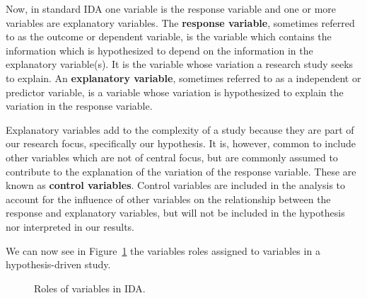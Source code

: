 \documentclass[
  letterpaper,
]{latex/krantz}
\theoremstyle{definition}
\theoremstyle{remark}
\begin{document}
Now, in standard IDA one variable is the response variable and one or
more variables are explanatory variables. The \textbf{response
variable}, sometimes referred to as the outcome or dependent variable,
is the variable which contains the information which is hypothesized to
depend on the information in the explanatory variable(s). It is the
variable whose variation a research study seeks to explain. An
\textbf{explanatory variable}, sometimes referred to as a independent or
predictor variable, is a variable whose variation is hypothesized to
explain the variation in the response variable.

Explanatory variables add to the complexity of a study because they are
part of our research focus, specifically our hypothesis. It is, however,
common to include other variables which are not of central focus, but
are commonly assumed to contribute to the explanation of the variation
of the response variable. These are known as \textbf{control variables}.
Control variables are included in the analysis to account for the
influence of other variables on the relationship between the response
and explanatory variables, but will not be included in the hypothesis
nor interpreted in our results.

We can now see in Figure~\ref{fig-aa-ida-variables} the variables roles
assigned to variables in a hypothesis-driven study.

\begin{figure}[H]


\caption{\label{fig-aa-ida-variables}Roles of variables in IDA.}

\end{figure}%
\end{document}
